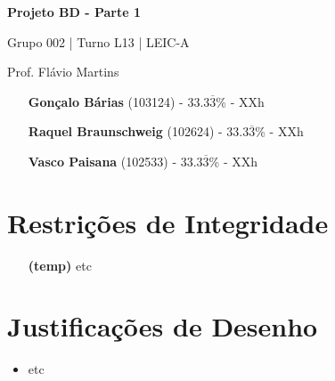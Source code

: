 \documentclass[12pt,a4paper]{article}
\begin{document}
  \begin{titlepage}
    \begin{center}
      \vspace*{5cm}

      \Huge
      \textbf{Projeto BD - Parte 1}

      \vspace{0.5cm}
      \LARGE
      Grupo 002 | Turno L13 | LEIC-A

      \vspace{0.5cm}
      \large
      Prof. Flávio Martins

      \vfill
    \end{center}
    \large
    \begin{itemize}
      \item[] \textbf{Gonçalo Bárias} (103124) - 33.3$\overline{3}$\% - XXh
      \item[] \textbf{Raquel Braunschweig} (102624) - 33.3$\overline{3}$\% - XXh
      \item[] \textbf{Vasco Paisana} (102533) - 33.3$\overline{3}$\% - XXh
    \end{itemize}
  \end{titlepage}

  \begin{landscape}
    
  \end{landscape}

  \section*{Restrições de Integridade}
  \footnotesize
  \begin{itemize}
    \item[\textbf{(temp)}] etc
  \end{itemize}

  \section*{Justificações de Desenho}
  \normalsize
  \begin{itemize}
    \item etc
  \end{itemize}
\end{document}
